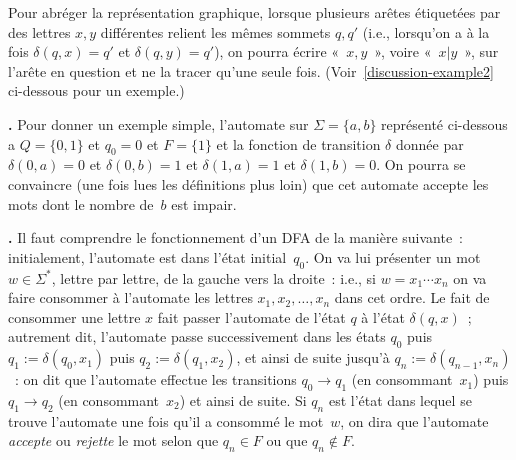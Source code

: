 \documentclass[12pt,a4paper]{article}
\theoremstyle{definition}
\newcommand\thingy{%
\refstepcounter{comcnt}\medskip\noindent\textbf{\thecomcnt.} }
\begin{document}
Pour abréger la représentation graphique, lorsque plusieurs arêtes
étiquetées par des lettres $x,y$ différentes relient les mêmes sommets
$q,q'$ (i.e., lorsqu'on a à la fois $\delta(q,x) = q'$ et $\delta(q,y)
= q'$), on pourra écrire « $x,y$ », voire « $x|y$ », sur l'arête en
question et ne la tracer qu'une seule fois.
(Voir \ref{discussion-example2} ci-dessous pour un exemple.)

\thingy\label{discussion-example1} Pour donner un exemple simple,
l'automate sur $\Sigma = \{a,b\}$ représenté ci-dessous a $Q =
\{0,1\}$ et $q_0 = 0$ et $F = \{1\}$ et la fonction de transition
$\delta$ donnée par $\delta(0,a) = 0$ et $\delta(0,b) = 1$ et
$\delta(1,a) = 1$ et $\delta(1,b) = 0$.  On pourra se convaincre (une
fois lues les définitions plus loin) que cet automate accepte les mots
dont le nombre de $b$ est impair.

\begin{center}


\end{center}

\thingy Il faut comprendre le fonctionnement d'un DFA de la manière
suivante : initialement, l'automate est dans l'état initial $q_0$.  On
va lui présenter un mot $w \in \Sigma^*$, lettre par lettre, de la
gauche vers la droite : i.e., si $w = x_1\cdots x_n$ on va faire
consommer à l'automate les lettres $x_1,x_2,\ldots,x_n$ dans cet
ordre.  Le fait de consommer une lettre $x$ fait passer l'automate de
l'état $q$ à l'état $\delta(q,x)$ ; autrement dit, l'automate passe
successivement dans les états $q_0$ puis $q_1 := \delta(q_0,x_1)$ puis
$q_2 := \delta(q_1,x_2)$, et ainsi de suite jusqu'à $q_n :=
\delta(q_{n-1},x_n)$ : on dit que l'automate effectue les transitions
$q_0\to q_1$ (en consommant $x_1$) puis $q_1\to q_2$ (en
consommant $x_2$) et ainsi de suite.  Si $q_n$ est l'état dans lequel
se trouve l'automate une fois qu'il a consommé le mot $w$, on dira que
l'automate \emph{accepte} ou \emph{rejette} le mot selon que $q_n \in
F$ ou que $q_n \not\in F$.
\end{document}
